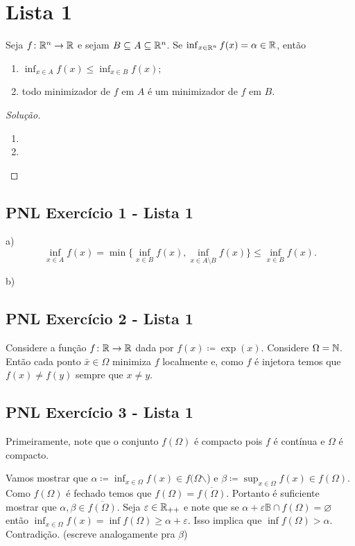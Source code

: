 \documentclass[12pt,twoside,a4paper]{book}
\begin{document}
\chapter*{Lista 1}
\begin{problema}
Seja \(f\colon\mathbb{R}^n\to\mathbb{R}\) e sejam \(B\subseteq A\subseteq\mathbb{R}^n\). Se
\(\inf_{x\in\mathbb{R}^n}f(x)=\alpha\in\mathbb{R}\), então
\begin{enumerate}[label=(\roman*)]
\item \(\inf_{x\in A}f(x)\leq\inf_{x\in B}f(x)\);
\item todo minimizador de \(f\) em \(A\) é um minimizador de \(f\) em \(B\).
\end{enumerate}
\end{problema}
\begin{proof}[Solução]\hfill
  \begin{enumerate}[label=(\roman*)]
  \item
  \item
    \end{enumerate}
\end{proof}

\section{PNL Exercício 1 - Lista 1}
\label{sec:org41d184a}

a) \[\inf_{x\in A} f(x)=\min\{\inf_{x\in B}f(x), \inf_{x\in A\setminus B}f(x)\}\leq\inf_{x\in B}f(x).\]

b)

\section{PNL Exercício 2 - Lista 1}
\label{sec:org8affeec}

Considere a função \(f\colon\mathbb{R}\to\mathbb{R}\) dada por \(f(x)\coloneqq\exp(x)\). Considere \(\Omega=\mathbb{N}\).
Então cada ponto \(\bar{x}\in\Omega\) minimiza \(f\) localmente e, como \(f\) é injetora temos que \(f(x)\not=f(y)\)
sempre que \(x\not= y\).

\section{PNL Exercício 3 - Lista 1}
\label{sec:orga567c7d}
Primeiramente, note que o conjunto \(f(\Omega)\) é compacto pois \(f\) é contínua e \(\Omega\) é compacto.

Vamos mostrar que \(\alpha\coloneqq\inf_{x\in\Omega}f(x)\in f(\Omega\)$\backslash$) e \(\beta\coloneqq\sup_{x\in\Omega}f(x)\in f(\Omega)\).
Como \(f(\Omega)\) é fechado temos que \(f(\Omega)=\overline{f(\Omega)}\). Portanto é suficiente mostrar que 
\(\alpha,\beta\in\overline{f(\Omega)}\). Seja \(\varepsilon\in\mathbb{R}_{++}\) e note que se \(\alpha +\varepsilon\mathbb{B}\cap f(\Omega)=\varnothing\) então \(\inf_{x\in\Omega}f(x)=\inf f(\Omega)\geq\alpha+\varepsilon\).
Isso implica que \(\inf f(\Omega) > \alpha\). Contradição. (escreve analogamente pra \(\beta\))
\end{document}
